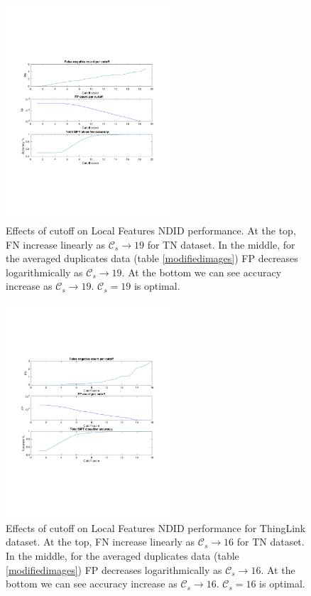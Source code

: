 \documentclass[english,12pt,a4paper,pdftex,elec,utf8, table]{aaltothesis}
\begin{document}
\begin{figure}[htb]
\begin{center}
\includegraphics[height=8cm]{figures/SIFTCountROC}
\end{center}
\caption{ Effects of cutoff on Local Features NDID performance. At the top, FN increase linearly as $\mathcal{C}_s \rightarrow 19$ for TN dataset. In the middle, for the averaged duplicates data (table \ref{modifiedimages}) FP decreases logarithmically as $\mathcal{C}_s \rightarrow 19$. At the bottom we can see accuracy increase as $\mathcal{C}_s \rightarrow 19$. $\mathcal{C}_s=19$ is optimal.}
\label{figcutoff}
\end{figure}

\begin{figure}[htb]
\begin{center}
\includegraphics[height=8cm]{figures/thinglink_SIFTCountROC}
\end{center}
\caption{ Effects of cutoff on Local Features NDID performance for ThingLink dataset. At the top, FN increase linearly as $\mathcal{C}_s \rightarrow 16$ for TN dataset. In the middle, for the averaged duplicates data (table \ref{modifiedimages}) FP decreases logarithmically as $\mathcal{C}_s \rightarrow 16$. At the bottom we can see accuracy increase as $\mathcal{C}_s \rightarrow 16$. $\mathcal{C}_s=16$ is optimal.}
\label{thinglinkfigcutoff}
\end{figure}
\end{document}
